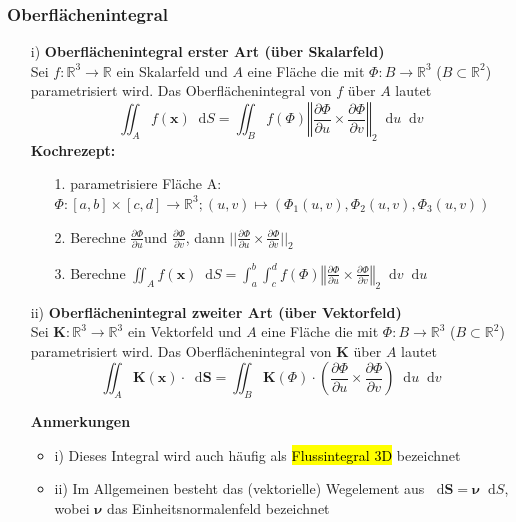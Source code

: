 \documentclass[8pt, a4paper, landscape, fleqn]{scrartcl}
\newenvironment {annotation}[1]
				{\begin{itshape} \begin{small} \textbf{#1} \begin{itemize}}
				{\end{itemize} \end{small} \end{itshape}}
\providecommand{\diff}{\mathop{} \! \mathrm{d}}
\begin{document}
\begin{multicols*}{3}
				\subsubsection{Oberflächenintegral}
					\begin{itemize}
						\item[i)] \textbf{Oberflächenintegral erster Art (über Skalarfeld)}\\
						Sei $f: \mathbb{R}^3 \rightarrow \mathbb{R}$ ein Skalarfeld und $A$ eine Fläche die mit $\Phi: B \rightarrow \mathbb{R}^3$ ($B \subset \mathbb{R}^2$) parametrisiert wird. Das Oberflächenintegral von $f$ über $A$ lautet
						\[\iint_A f(\textbf{x}) \diff S = \iint_B f(\Phi) \left \Vert \frac{\partial \Phi}{\partial u} \times \frac{\partial \Phi}{\partial v} \right \Vert_2 \diff u \diff v\]
						\textbf{Kochrezept:}
						\begin{itemize}
						    \item[1.] parametrisiere Fläche A: $\Phi : [a,b]\times [c,d] \rightarrow \mathbb{R}^3; (u,v) \mapsto (\Phi_1(u,v),\Phi_2(u,v),\Phi_3(u,v))$
						    \item[2.] Berechne $\frac{\partial \Phi}{\partial u}$und $ \frac{\partial \Phi}{\partial v}$, dann $\vert \vert\frac{\partial \Phi}{\partial u} \times \frac{\partial \Phi}{\partial v}\vert \vert_2$
						    \item[3.] Berechne $\iint_A f(\textbf{x}) \diff S = \int_a^b \int_c^d f(\Phi) \left \Vert \frac{\partial \Phi}{\partial u} \times \frac{\partial \Phi}{\partial v} \right \Vert_2 \diff v \diff u
						    $
						\end{itemize}
						\item[ii)] \textbf{Oberflächenintegral zweiter Art (über Vektorfeld)}\\
						Sei $\textbf{K}: \mathbb{R}^3 \rightarrow \mathbb{R}^3$ ein Vektorfeld und $A$ eine Fläche die mit $\Phi: B \rightarrow \mathbb{R}^3$ ($B \subset \mathbb{R}^2$) parametrisiert wird. Das Oberflächenintegral von $\textbf{K}$ über $A$ lautet
						\[\iint_A \textbf{K}(\textbf{x})  \cdot \diff \textbf{S} = \iint_B \textbf{K}(\Phi) \cdot \left ( \frac{\partial \Phi}{\partial u} \times \frac{\partial \Phi}{\partial v} \right) \diff u \diff v\]
						\begin{annotation}{Anmerkungen}
							\item[i)] Dieses Integral wird auch häufig als \hl{Flussintegral 3D} bezeichnet
							\item[ii)] Im Allgemeinen besteht das (vektorielle) Wegelement aus $\diff \textbf{S}=\bm{\nu} \diff S$, wobei $\bm{\nu}$ das Einheitsnormalenfeld bezeichnet

\end{annotation}
\end{itemize}
\end{multicols*}
\end{document}
